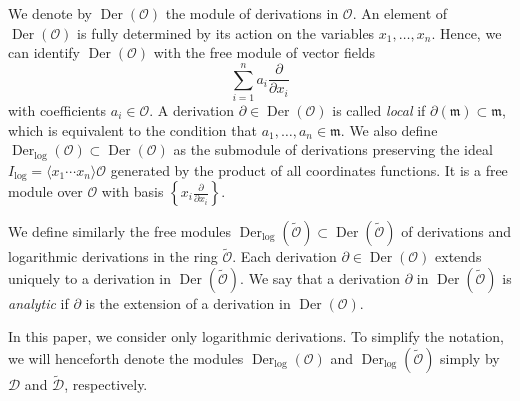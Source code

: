 \documentclass[10pt,twoside,reqno]{amsart}
\theoremstyle{remark}
\theoremstyle{remark}
\newcommand{\tmem}[1]{{\em #1\/}}
\newcommand{\tmop}[1]{{\operatorname{#1}}}
\newcommand{\tO}{\widetilde{\mathcal{O}}}
\newcommand{\oO}{\mathcal{O}}
\newcommand{\cD}{\mathcal{D}}
\newcommand{\tcD}{\widetilde{\cD}}
\begin{document}
We denote by $\tmop{Der} \left( \oO \right)$ the module of derivations in $\oO$. An element of 
$\tmop{Der} \left( \oO \right)$ is fully determined by its action on the variables $x_1,\ldots,x_n$. Hence, we can identify $\tmop{Der} \left( \oO \right)$ with 
the free module of vector fields
\[ \sum_{i = 1}^n a_i \frac{\partial}{\partial x_i} \]
with coefficients $a_i \in \oO$. 
A derivation $\partial \in \tmop{Der} \left( \oO \right)$ is called {\tmem{local}} if $\partial
(\mathfrak{m}) \subset \mathfrak{m}$, which is equivalent to the condition that
$a_1,\ldots,a_n\in\mathfrak{m}$. We also define
$\tmop{Der}_{\log} (\mathcal{O}) \subset
\tmop{Der} \left( \oO \right)$ as the submodule of derivations preserving the
ideal $I_{\log} = \langle x_1 \cdots x_n\rangle\mathcal{O}$ generated by the product of all coordinates functions. It is a free module over $\mathcal{O}$ with basis $\left\{ x_i
\frac{\partial}{\partial x_i} \right\}$.

We define similarly the free modules $\tmop{Der}_{\log} \left( \tO \right)
\subset \tmop{Der} \left( \tO \right)$ of derivations and logarithmic
derivations in the ring $\tO$. Each derivation $\partial \in \tmop{Der} \left(
\oO \right)$ extends uniquely to a derivation in $\tmop{Der} \left( \tO
\right)$. We say that a derivation $\partial$ in $\tmop{Der} \left( \tO
\right)$ is {\tmem{analytic}} if $\partial$ is the extension of a derivation
in $\tmop{Der} \left( \oO \right)$.

In this paper, we consider only logarithmic derivations. To simplify the notation, we will henceforth denote the modules 
\(\tmop{Der}_{\log}(\oO)\) and \(\tmop{Der}_{\log}(\tO)\) simply by \(\cD\) and \(\tcD\), respectively.
\end{document}
